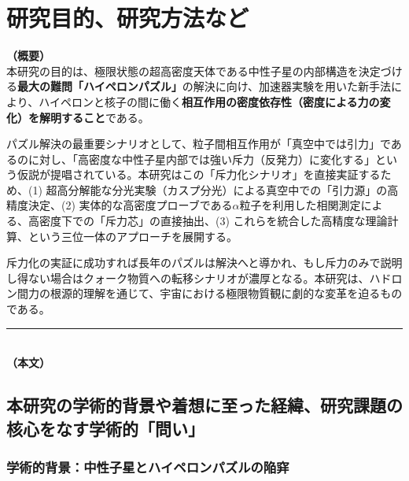 \documentclass[11pt,a4j,dvipdfmx]{jarticle} 					%
\newcommand{\研究課題名}{加速器実験による短距離バリオン間相互作用の解明と中性子星ハイペロンパズルの解決}
\newcommand{\研究機関名}{東北大学}
\newcommand{\研究代表者氏名}{市川裕大}
\newcommand{\研究期間の最終元号年度}{13}
\begin{document}

\section{研究目的、研究方法など}

\noindent
\textbf{（概要）}\\
	本研究の目的は、極限状態の超高密度天体である中性子星の内部構造を決定づける\textbf{最大の難問「ハイペロンパズル」}の解決に向け、加速器実験を用いた新手法により、ハイペロンと核子の間に働く\textbf{相互作用の密度依存性（密度による力の変化）を解明すること}である。
	
	パズル解決の最重要シナリオとして、粒子間相互作用が「真空中では引力」であるのに対し、「高密度な中性子星内部では強い斥力（反発力）に変化する」という仮説が提唱されている。本研究はこの「斥力化シナリオ」を直接実証するため、(1) 超高分解能な分光実験（カスプ分光）による真空中での「引力源」の高精度決定、(2) 実体的な高密度プローブである$\alpha$粒子を利用した相関測定による、高密度下での「斥力芯」の直接抽出、(3) これらを統合した高精度な理論計算、という三位一体のアプローチを展開する。
	
	斥力化の実証に成功すれば長年のパズルは解決へと導かれ、もし斥力のみで説明し得ない場合はクォーク物質への転移シナリオが濃厚となる。本研究は、ハドロン間力の根源的理解を通じて、宇宙における極限物質観に劇的な変革を迫るものである。
	
	\vspace*{1zw}

\noindent
\rule{\linewidth}{1pt}\\
\noindent
\textbf{（本文）}\\

	\vspace*{-2.5zw}
\subsection{本研究の学術的背景や着想に至った経緯、研究課題の核心をなす学術的「問い」}

\subsubsection{学術的背景：中性子星とハイペロンパズルの陥穽}
\end{document}
